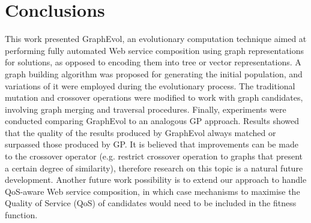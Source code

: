 \documentclass{article}
\begin{document}
\section{Conclusions}\label{conclusions}
This work presented GraphEvol, an evolutionary computation technique aimed at performing fully automated Web service composition using graph representations for solutions, as opposed to encoding them into tree or vector representations. A graph building algorithm was proposed for generating the initial population, and variations of it were employed during the evolutionary process. The traditional mutation and crossover operations were modified to work with graph candidates, involving graph merging and traversal procedures. Finally, experiments were conducted comparing GraphEvol to an analogous GP approach. Results showed that the quality of the results produced by GraphEvol always matched or surpassed those produced by GP. It is believed that improvements can be made to the crossover operator (e.g. restrict crossover operation to graphs that present a certain degree of similarity), therefore research on this topic is a natural future development. Another future work possibility is to extend our approach to handle QoS-aware Web service composition, in which case mechanisms to maximise the Quality of Service (QoS) of candidates \cite{jaeger2007qos} would need to be included in the fitness function.

\clearpage


\end{document}
